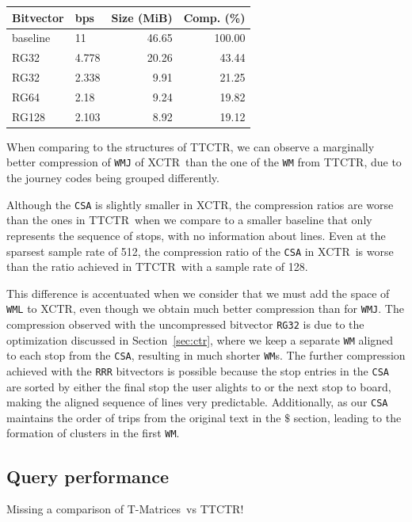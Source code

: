 \documentclass[runningheads]{llncs}
\newcommand{\acumm}{T-Matrices} %
\newcommand{\ctr}{XCTR}
\newcommand{\ttctr}{TTCTR}
\begin{document}
\begin{table}
\begin{subtable}[t]{.48\linewidth}
\begin{tabular}[t]{|l|l|r|r|}
        \hline
        Bitvector & bps & Size (MiB) & Comp. (\%) \\
         \hline
        baseline & 11 & 46.65 & 100.00 \\
        RG32 & 4.778 & 20.26 & 43.44 \\
        RG32 & 2.338 & 9.91 & 21.25 \\
        RG64 & 2.18 & 9.24 & 19.82 \\
        RG128 & 2.103 & 8.92 & 19.12 \\
        \hline
    \end{tabular}
    \end{subtable}%
\end{table}

When comparing to the structures of \ttctr, we can observe a marginally better compression of \texttt{WMJ} of \ctr~than the one of the \texttt{WM} from \ttctr, due to the journey codes being grouped differently.

Although the \texttt{CSA} is slightly smaller in \ctr, the compression ratios are worse than the ones in \ttctr~when we compare to a smaller baseline that only represents the sequence of stops, with no information about lines. Even at the sparsest sample rate of 512, the compression ratio of the \texttt{CSA} in \ctr~is worse than the ratio achieved in \ttctr~with a sample rate of 128.

This difference is accentuated when we consider that we must add the space of \texttt{WML} to \ctr, even though we obtain much better compression than for \texttt{WMJ}. The compression observed with the uncompressed bitvector \texttt{RG32} is due to the optimization discussed in Section~\ref{sec:ctr}, where we keep a separate \texttt{WM} aligned to each stop from the \texttt{CSA}, resulting in much shorter \texttt{WM}s. The further compression achieved with the \texttt{RRR} bitvectors is possible because the stop entries in the \texttt{CSA} are sorted by either the final stop the user alights to or the next stop to board, making the aligned sequence of lines very predictable. Additionally, as our \texttt{CSA} maintains the order of trips from the original text in the $\$$ section, leading to the formation of clusters in the first \texttt{WM}.

\subsection{Query performance}
\label{sec:time}
Missing a comparison of \acumm~vs \ttctr!
\end{document}
